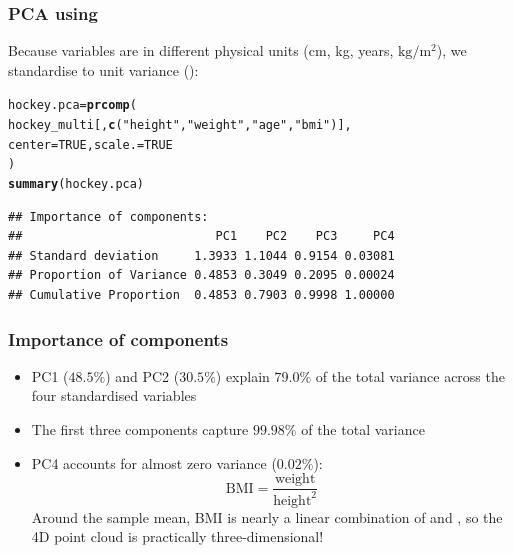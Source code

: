 \documentclass[aspectratio=169]{beamer}\usepackage[]{graphicx}\usepackage[]{xcolor}
\makeatletter
\newcommand{\hlnum}[1]{\textcolor[rgb]{0.686,0.059,0.569}{#1}}%
\newcommand{\hlsng}[1]{\textcolor[rgb]{0.192,0.494,0.8}{#1}}%
\newcommand{\hldef}[1]{\textcolor[rgb]{0.345,0.345,0.345}{#1}}%
\newcommand{\hlkwb}[1]{\textcolor[rgb]{0.69,0.353,0.396}{#1}}%
\newcommand{\hlkwc}[1]{\textcolor[rgb]{0.333,0.667,0.333}{#1}}%
\newcommand{\hlkwd}[1]{\textcolor[rgb]{0.737,0.353,0.396}{\textbf{#1}}}%
\newenvironment{kframe}{%
 \def\at@end@of@kframe{}%
 \ifinner\ifhmode%
  \def\at@end@of@kframe{\end{minipage}}%
  \begin{minipage}{\columnwidth}%
 \fi\fi%
 \def\FrameCommand##1{\hskip\@totalleftmargin \hskip-\fboxsep
 \colorbox{shadecolor}{##1}\hskip-\fboxsep
     \hskip-\linewidth \hskip-\@totalleftmargin \hskip\columnwidth}%
 \MakeFramed {\advance\hsize-\width
   \@totalleftmargin\z@ \linewidth\hsize
   \@setminipage}}%
 {\par\unskip\endMakeFramed%
 \at@end@of@kframe}
\newenvironment{knitrout}{}{} %
\makeatother
\begin{document}
\begin{frame}[fragile]\frametitle{PCA using }
Because variables are in different physical units (cm, kg, years, $\text{kg}/\text{m}^2$), we standardise to unit variance ():
\vfill
\begin{knitrout}
\color{fgcolor}\begin{kframe}
\begin{alltt}
\hldef{hockey.pca} \hlkwb{=} \hlkwd{prcomp}\hldef{(}
  \hldef{hockey_multi[,} \hlkwd{c}\hldef{(}\hlsng{"height"}\hldef{,} \hlsng{"weight"}\hldef{,} \hlsng{"age"}\hldef{,} \hlsng{"bmi"}\hldef{)],}
  \hlkwc{center} \hldef{=} \hlnum{TRUE}\hldef{,} \hlkwc{scale.} \hldef{=} \hlnum{TRUE}
\hldef{)}
\hlkwd{summary}\hldef{(hockey.pca)}
\end{alltt}
\begin{verbatim}
## Importance of components:
##                           PC1    PC2    PC3     PC4
## Standard deviation     1.3933 1.1044 0.9154 0.03081
## Proportion of Variance 0.4853 0.3049 0.2095 0.00024
## Cumulative Proportion  0.4853 0.7903 0.9998 1.00000
\end{verbatim}
\end{kframe}
\end{knitrout}
\end{frame}


\begin{frame}\frametitle{Importance of components}
\begin{itemize}
\item PC1 ($48.5\%$) and PC2 ($30.5\%$) explain $79.0\%$ of the total variance across the four standardised variables
\vfill
\item The first three components capture $99.98\%$ of the total variance
\vfill
\item PC4 accounts for almost zero variance ($0.02\%$):
\[
\text{BMI} = \frac{\text{weight}}{\text{height}^2}
\]
Around the sample mean, BMI is nearly a linear combination of  and , so the 4D point cloud is practically three-dimensional!
\end{itemize}
\end{frame}
\end{document}
